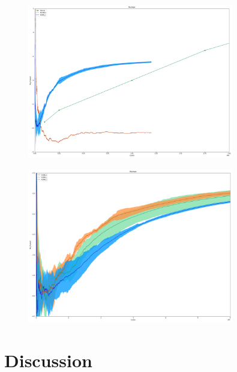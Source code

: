 \documentclass{article}
\theoremstyle{definition}
\newtheorem{primary statistics}[definition]{Primary Statistics}
\newtheorem{auxiliary statistics}[definition]{Auxiliary Statistics}
\begin{document}
 \begin{figure}[h]
 \centering
    \includegraphics[width=9cm]{RvVvU_Pacman}
\end{figure}

 \begin{figure}[h]
 \centering
    \includegraphics[width=9cm]{BT_Pacman}
\end{figure}

\newpage

\section{Discussion}
\end{document}
